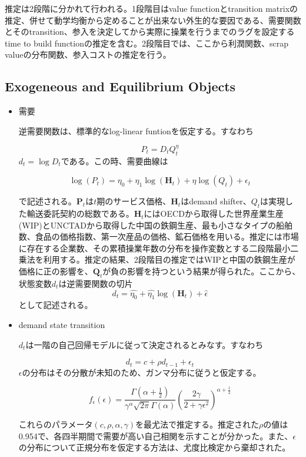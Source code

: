 \documentclass[11pt]{jsarticle}
\begin{document}
推定は2段階に分かれて行われる。1段階目はvalue functionとtransition matrixの推定、併せて動学均衡から定めることが出来ない外生的な要因である、需要関数とそのtransition、参入を決定してから実際に操業を行うまでのラグを設定するtime to build functionの推定を含む。2段階目では、ここから利潤関数、scrap valueの分布関数、参入コストの推定を行う。

\subsection{Exogeneous and Equilibrium Objects}

\begin{itemize}
  \item 需要

  逆需要関数は、標準的なlog-linear funtionを仮定する。すなわち

  \[
  P_t = D_t Q_t^{\eta}
  \]
  $d_t = \log D_t$である。この時、需要曲線は

  \[
  \log (P_t) = \eta_0 + \eta_1 \log (\mathbf{H}_t) + \eta \log (Q_t) + \epsilon_t
  \]

  で記述される。$\mathbf{P}_t$は$t$期のサービス価格、$\mathbf{H}_t$はdemand shifter、$Q_t$は実現した輸送委託契約の総数である。$\mathbf{H}_t$にはOECDから取得した世界産業生産(WIP)とUNCTADから取得した中国の鉄鋼生産、最も小さなタイプの船舶数、食品の価格指数、第一次産品の価格、鉱石価格を用いる。推定には市場に存在する企業数、その累積操業年数の分布を操作変数とする二段階最小二乗法を利用する。推定の結果、2段階目の推定ではWIPと中国の鉄鋼生産が価格に正の影響を、$\mathbf{Q}_t$が負の影響を持つという結果が得られた。ここから、状態変数$d_t$は逆需要関数の切片
  \[
  d_t = \hat{\eta_0} + \hat{\eta_1} \log (\mathbf{H}_t) + \hat{\epsilon}
  \]
  として記述される。

  \item demand state transition

  $d_t$は一階の自己回帰モデルに従って決定されるとみなす。すなわち

  \[
  d_t = c + \rho d_{t-1} + \epsilon_{t}
  \]
  $\epsilon$の分布はその分散が未知のため、ガンマ分布に従うと仮定する。

  \[
  f_{\epsilon}(\epsilon) = \dfrac{\Gamma(\alpha + \frac{1}{2})}{\gamma^{\alpha} \sqrt{2 \pi} \Gamma(\alpha)} \left( \dfrac{2 \gamma}{2 + \gamma \epsilon^2} \right)^{\alpha + \frac{1}{2}}
  \]

  これらのパラメータ$(c, \rho, \alpha, \gamma)$を最尤法で推定する。推定された$\rho$の値は0.954で、各四半期間で需要が高い自己相関を示すことが分かった。また、$\epsilon$の分布について正規分布を仮定する方法は、尤度比検定から棄却された。


\end{itemize}
\end{document}
